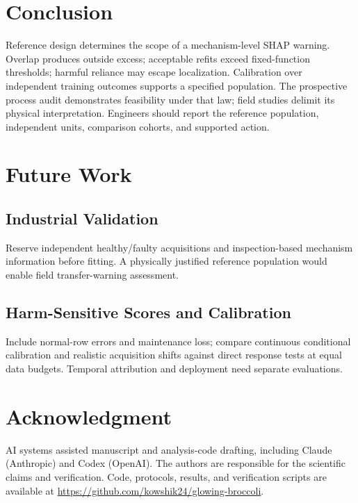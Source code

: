 \documentclass[conference]{IEEEtran}
\begin{document}
\section{Conclusion}
Reference design determines the scope of a mechanism-level SHAP warning. Overlap produces outside excess; acceptable refits exceed fixed-function thresholds; harmful reliance may escape localization. Calibration over independent training outcomes supports a specified population. The prospective process audit demonstrates feasibility under that law; field studies delimit its physical interpretation. Engineers should report the reference population, independent units, comparison cohorts, and supported action.

\section{Future Work}
\subsection{Industrial Validation}
Reserve independent healthy/faulty acquisitions and inspection-based mechanism information before fitting. A physically justified reference population would enable field transfer-warning assessment.

\subsection{Harm-Sensitive Scores and Calibration}
Include normal-row errors and maintenance loss; compare continuous conditional calibration and realistic acquisition shifts against direct response tests at equal data budgets. Temporal attribution and deployment need separate evaluations.

\section*{Acknowledgment}
AI systems assisted manuscript and analysis-code drafting, including Claude (Anthropic) and Codex (OpenAI). The authors are responsible for the scientific claims and verification. Code, protocols, results, and verification scripts are available at \url{https://github.com/kowshik24/glowing-broccoli}.


\end{document}
